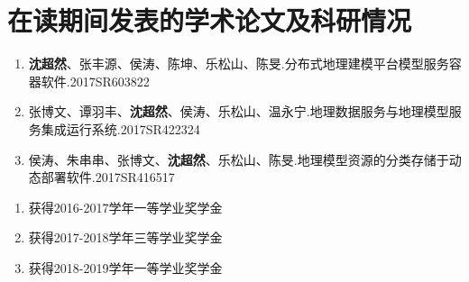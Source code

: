\chapter{在读期间发表的学术论文及科研情况}

\begin{enumerate}
    \item \textbf{沈超然}、张丰源、侯涛、陈坤、乐松山、陈旻.分布式地理建模平台模型服务容器软件.2017SR603822
    \item 张博文、谭羽丰、\textbf{沈超然}、侯涛、乐松山、温永宁.地理数据服务与地理模型服务集成运行系统.2017SR422324
    \item 侯涛、朱串串、张博文、\textbf{沈超然}、乐松山、陈旻.地理模型资源的分类存储于动态部署软件.2017SR416517
\end{enumerate}

\par \qquad

\begin{enumerate}
    \item 获得2016-2017学年一等学业奖学金
    \item 获得2017-2018学年三等学业奖学金
    \item 获得2018-2019学年一等学业奖学金
\end{enumerate}